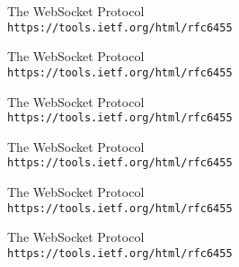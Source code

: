 \begin{thebibliography}{9}

The WebSocket Protocol
\\\texttt{https://tools.ietf.org/html/rfc6455}

The WebSocket Protocol
\\\texttt{https://tools.ietf.org/html/rfc6455}

The WebSocket Protocol
\\\texttt{https://tools.ietf.org/html/rfc6455}

The WebSocket Protocol
\\\texttt{https://tools.ietf.org/html/rfc6455}

The WebSocket Protocol
\\\texttt{https://tools.ietf.org/html/rfc6455}

The WebSocket Protocol
\\\texttt{https://tools.ietf.org/html/rfc6455}

\end{thebibliography}
